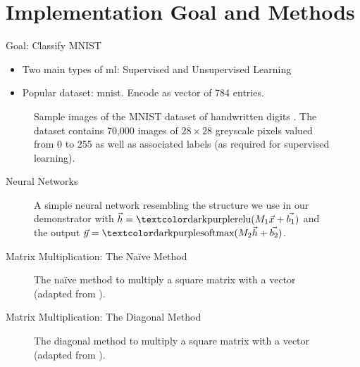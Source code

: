 \section{Implementation Goal and Methods}
\begin{frame}{Goal: Classify MNIST}
  \begin{itemize}
    \item Two main types of \gls{ml}: Supervised and Unsupervised Learning
    \item Popular dataset: \gls{mnist}. Encode as vector of 784 entries.
  \end{itemize}

  \begin{figure}[H]
    \centering
    \caption[Sample images of the MNIST dataset]{
      Sample images of the MNIST dataset of handwritten digits \parencite{mnist-original}.
      The dataset contains 70,000 images of $28 \times 28$ greyscale pixels valued from 0 to 255 as well as associated labels (as required for supervised learning).
    }
    \label{fig:mnist}
  \end{figure}
\end{frame}

\begin{frame}{Neural Networks}
  \begin{figure}[H]
    \centering
    \caption[Neural Network illustration resembling the one used in our demonstrator]{
      A simple neural network resembling the structure we use in our demonstrator with $\vec{h} = \cryptop{relu}(M_1 \vec{x} + \vec{b_1})$ and the output $\vec{y} = \cryptop{softmax}(M_2 \vec{h} + \vec{b_2})$.
    }
    \label{fig:neural-network}
  \end{figure}
\end{frame}

\begin{frame}{Matrix Multiplication: The Na\"ive Method}
  \begin{figure}[H]
    \centering
    \hspace{-3cm}
    \caption[Naïve matrix multiplication method]{The naïve method to multiply a square matrix with a vector (adapted from \cite{2018-gazelle}).}
    \label{fig:naive-method}
  \end{figure}
\end{frame}

\begin{frame}{Matrix Multiplication: The Diagonal Method}
  \begin{figure}[H]
    \centering
    \hspace{-3cm}
    \caption[Diagonal matrix multiplication method]{The diagonal method to multiply a square matrix with a vector (adapted from \cite{2018-gazelle}).}
    \label{fig:diagonal-method}
  \end{figure}
\end{frame}

